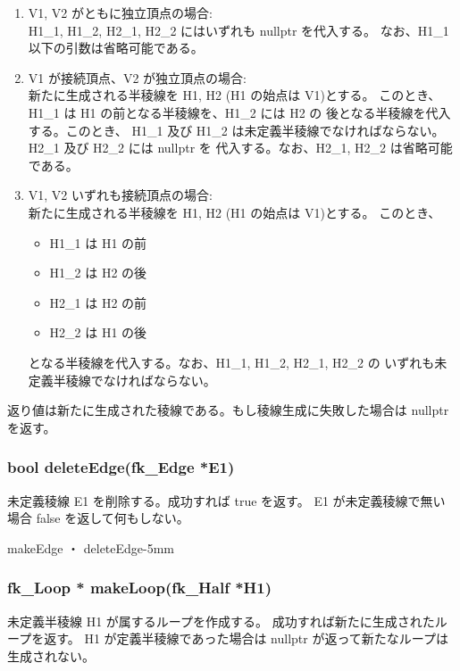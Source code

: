 	\begin{enumerate}
	 \item V1, V2 がともに独立頂点の場合: \\
		H1\_1, H1\_2, H2\_1, H2\_2 にはいずれも nullptr を代入する。
		なお、H1\_1 以下の引数は省略可能である。

	 \item V1 が接続頂点、V2 が独立頂点の場合: \\
		新たに生成される半稜線を H1, H2 (H1 の始点は V1)とする。
		このとき、H1\_1 は H1 の前となる半稜線を、H1\_2 には H2 の
		後となる半稜線を代入する。このとき、
		H1\_1 及び H1\_2 は未定義半稜線でなければならない。
		H2\_1 及び H2\_2 には nullptr を
		代入する。なお、H2\_1, H2\_2 は省略可能である。

	 \item V1, V2 いずれも接続頂点の場合: \\
		新たに生成される半稜線を H1, H2 (H1 の始点は V1)とする。
		このとき、
		\begin{itemize}
		 \item H1\_1 は H1 の前
		 \item H1\_2 は H2 の後
		 \item H2\_1 は H2 の前
		 \item H2\_2 は H1 の後
		\end{itemize}
		となる半稜線を代入する。なお、H1\_1, H1\_2, H2\_1, H2\_2 の
		いずれも未定義半稜線でなければならない。
	\end{enumerate}
	返り値は新たに生成された稜線である。もし稜線生成に失敗した場合は
	nullptr を返す。

 \subsubsection*{\hspace*{0.6cm}bool deleteEdge(fk\_Edge *E1)}
   	未定義稜線 E1 を削除する。成功すれば true を返す。
	E1 が未定義稜線で無い場合 false を返して何もしない。

	{makeEdge ・ deleteEdge}{-5mm}

 \subsubsection*{\hspace*{0.6cm}fk\_Loop * makeLoop(fk\_Half *H1)}
	未定義半稜線 H1 が属するループを作成する。
	成功すれば新たに生成されたループを返す。
	H1 が定義半稜線であった場合は nullptr が返って新たなループは生成されない。

